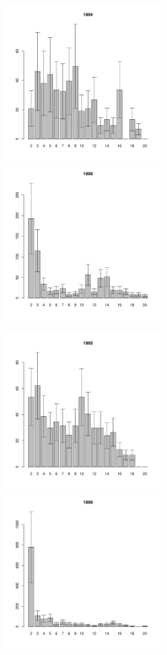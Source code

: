 \documentclass[12pt, a4paper]{article}
\begin{document}
\begin{figure}[h]
\begin{multicols}{3}
\hfill
\includegraphics[width=60mm]{../White_Sea/Luvenga_II_razrez/low_beatch2_1994_.pdf}
\hfill
\includegraphics[width=60mm]{../White_Sea/Luvenga_II_razrez/low_beatch2_1998_.pdf}

\end{multicols}


\begin{multicols}{3}
\hfill
\includegraphics[width=60mm]{../White_Sea/Luvenga_II_razrez/low_beatch2_1995_.pdf}
\hfill
\includegraphics[width=60mm]{../White_Sea/Luvenga_II_razrez/low_beatch2_1999_.pdf}


\end{multicols}
\end{figure}
\end{document}
